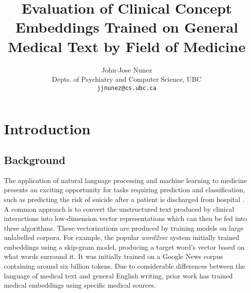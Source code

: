 \documentclass[10pt]{article}
\title{Evaluation of Clinical Concept Embeddings Trained on General Medical Text by Field of Medicine}
\author{John-Jose Nunez\\
  Depts. of Psychiatry and Computer Science, UBC\\
  {\tt jjnunez@cs.ubc.ca} 
}
\date{}
\begin{document}
\maketitle

\section{Introduction}

\subsection{Background}



The application of natural language processing and machine learning to medicine presents an exciting opportunity for tasks requiring prediction and classification, such as predicting the risk of suicide after a patient is discharged from hospital \cite{mccoyImprovingPredictionSuicide2016}. A common approach is to convert the unstructured text produced by clinical interactions into low-dimension vector representations which can then be fed into these algorithms. These vectorizations are produced by training models on large unlabelled corpora. For example, the popular \emph{word2vec} system \cite{mikolovEfficientEstimationWord2013} initially trained embeddings using a skip-gram model, producing a target word's vector based on what words surround it. It was initially trained on a Google News corpus containing around six billion tokens. Due to considerable differences between the language of medical text and general English writing, prior work has trained medical embeddings using specific medical sources. 
\end{document}
